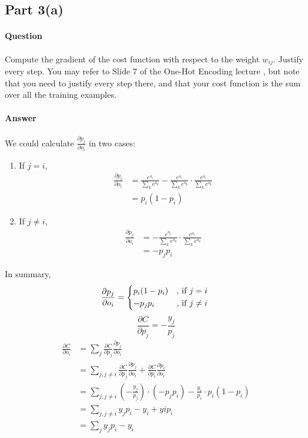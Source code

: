 \documentclass[11pt,twoside]{article}
\begin{document}
\subsection*{Part 3(a)}
\paragraph{Question}
Compute the gradient of the cost function with respect to the weight $w_{ij}$. Justify every step. You may refer to Slide 7 of the One-Hot Encoding lecture , but note that you need to justify every step there, and that your cost function is the sum over all the training examples.

\paragraph{Answer}
We could calculate $\frac{\partial p_j}{\partial o_i}$ in two cases:
\begin{enumerate}
\item If $j = i$,
\begin{align*}
\frac{\partial p_i}{\partial o_i} &= \frac{e^{o_i}}{\sum_{k}e^{o_k}} - \frac{e^{o_i}}{\sum_{k}e^{o_k}} \cdot \frac{e^{o_i}}{\sum_{k}e^{o_k}}\\
&= p_i(1 - p_i)
\end{align*}
\item If $j \neq i$,
\begin{align*}
\frac{\partial p_j}{\partial o_i} &= -\frac{e^{o_j}}{\sum_{k}e^{o_k}} \cdot \frac{e^{o_i}}{\sum_{k}e^{o_k}}\\
&= -p_jp_i
\end{align*}
\end{enumerate}
In summary,
\begin{equation}
    \frac{\partial p_j}{\partial o_i} =
    \begin{cases*}
      p_i(1 - p_i) &, if $j = i$ \\
      -p_jp_i &, if $j \neq i$
    \end{cases*}
\end{equation}
\[\frac{\partial C}{\partial p_j} = -\frac{y_j}{p_j}\]
\begin{align*}
\frac{\partial C}{\partial o_{i}} &= \sum_{j}\frac{\partial C}{\partial p_j} \frac{\partial p_j}{\partial o_i}\\
&= \sum_{j, j \neq i}\frac{\partial C}{\partial p_j} \frac{\partial p_j}{\partial o_i} + \frac{\partial C}{\partial p_i} \frac{\partial p_i}{\partial o_i}\\
&= \sum_{j, j \neq i}(-\frac{y_j}{p_j}) \cdot (-p_jp_i) - \frac{y_i}{p_i} \cdot p_i(1 - p_i)\\
&= \sum_{j, j \neq i}y_jp_i - y_i + yip_i\\
&= \sum_{j}y_jp_i - y_i\\
\end{align*}
\end{document}
